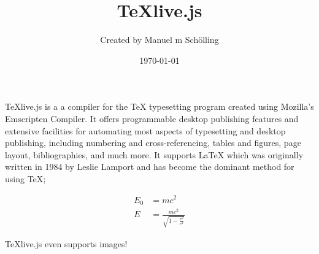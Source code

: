 \documentclass[12pt]{article}
\title{\TeX live.js}
\author{Created by Manuel m Sch\"olling}
\date{\today}
\begin{document}
  \maketitle
  \TeX{}live.js is a a compiler for the \TeX{}
  typesetting program created using Mozilla's Emscripten
  Compiler. It offers programmable desktop
  publishing features and extensive facilities for
  automating most aspects of typesetting and desktop
  publishing, including numbering and cross-referencing,
  tables and figures, page layout, bibliographies, and
  much more. It supports \LaTeX{} which was originally written 
  in 1984 by Leslie Lamport and has become the dominant method for
  using \TeX;
 
  \begin{align}
    E_0 &= mc^2                              \\
    E &= \frac{mc^2}{\sqrt{1-\frac{v^2}{c^2}}}
  \end{align}


  \TeX{}live.js even supports images!
\end{document}
